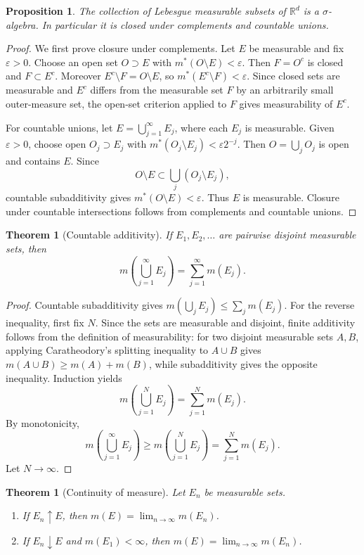 \documentclass[11pt,openany]{book}
\numberwithin{equation}{chapter}
\theoremstyle{definition}
\theoremstyle{plain}
\newtheorem{theorem}[definition]{Theorem}
\newtheorem{proposition}[definition]{Proposition}
\theoremstyle{remark}
\newcommand{\R}{\mathbb{R}}
\newcommand{\eps}{\varepsilon}
\newcommand{\1}{\mathbf{1}}
\begin{document}
\begin{proposition}
The collection of Lebesgue measurable subsets of \(\R^d\) is a \(\sigma\)-algebra.  In particular it is closed under complements and countable unions.
\end{proposition}

\begin{proof}
We first prove closure under complements.  Let \(E\) be measurable and fix \(\eps>0\).  Choose an open set \(O\supset E\) with \(m^*(O\setminus E)<\eps\).  Then \(F=O^c\) is closed and \(F\subset E^c\).  Moreover \(E^c\setminus F=O\setminus E\), so \(m^*(E^c\setminus F)<\eps\).  Since closed sets are measurable and \(E^c\) differs from the measurable set \(F\) by an arbitrarily small outer-measure set, the open-set criterion applied to \(F\) gives measurability of \(E^c\).

For countable unions, let \(E=\bigcup_{j=1}^\infty E_j\), where each \(E_j\) is measurable.  Given \(\eps>0\), choose open \(O_j\supset E_j\) with \(m^*(O_j\setminus E_j)<\eps 2^{-j}\).  Then \(O=\bigcup_jO_j\) is open and contains \(E\).  Since
\[
    O\setminus E\subset \bigcup_j(O_j\setminus E_j),
\]
countable subadditivity gives \(m^*(O\setminus E)<\eps\).  Thus \(E\) is measurable.  Closure under countable intersections follows from complements and countable unions.
\end{proof}

\begin{theorem}[Countable additivity]
If \(E_1,E_2,\ldots\) are pairwise disjoint measurable sets, then
\[
    m\left(\bigcup_{j=1}^\infty E_j\right)=\sum_{j=1}^\infty m(E_j).
\]
\end{theorem}

\begin{proof}
Countable subadditivity gives \(m(\bigcup_jE_j)\le\sum_jm(E_j)\).  For the reverse inequality, first fix \(N\).  Since the sets are measurable and disjoint, finite additivity follows from the definition of measurability: for two disjoint measurable sets \(A,B\), applying Caratheodory's splitting inequality to \(A\cup B\) gives \(m(A\cup B)\ge m(A)+m(B)\), while subadditivity gives the opposite inequality.  Induction yields
\[
    m\left(\bigcup_{j=1}^N E_j\right)=\sum_{j=1}^N m(E_j).
\]
By monotonicity,
\[
    m\left(\bigcup_{j=1}^\infty E_j\right)\ge m\left(\bigcup_{j=1}^N E_j\right)=\sum_{j=1}^N m(E_j).
\]
Let \(N\to\infty\).
\end{proof}

\begin{theorem}[Continuity of measure]
Let \(E_n\) be measurable sets.
\begin{enumerate}[label=(\roman*)]
    \item If \(E_n\uparrow E\), then \(m(E)=\lim_{n\to\infty}m(E_n)\).
    \item If \(E_n\downarrow E\) and \(m(E_1)<\infty\), then \(m(E)=\lim_{n\to\infty}m(E_n)\).
\end{enumerate}
\end{theorem}
\end{document}
